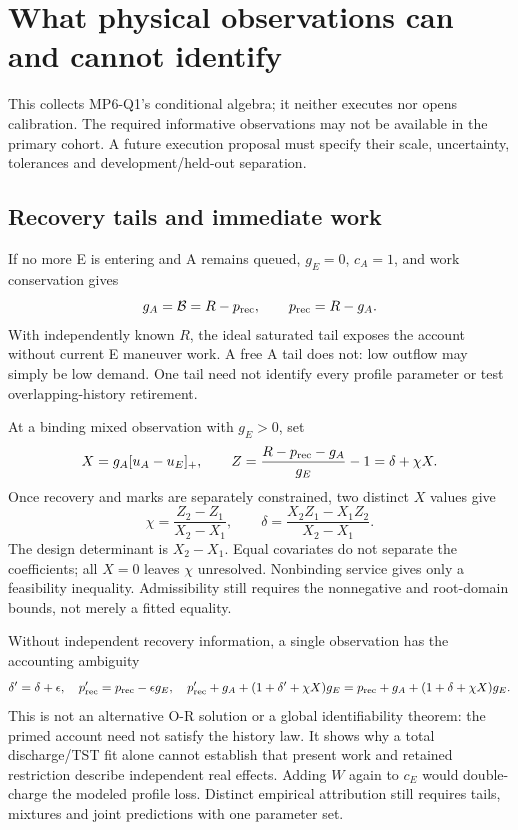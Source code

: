 \section{What physical observations can and cannot identify}
\label{sec:physical}
This collects MP6-Q1's conditional algebra; it neither executes nor opens
calibration. The required informative observations may not be available in
the primary cohort. A future execution proposal must specify their scale,
uncertainty, tolerances and development/held-out separation.

\subsection{Recovery tails and immediate work}
If no more E is entering and A remains queued, $g_E=0$, $c_A=1$, and
work conservation gives
\begin{equation}
 g_A=\mathcal B=R-p_{\mathrm{rec}},\qquad p_{\mathrm{rec}}=R-g_A. \label{eq:tailidentify}
\end{equation}
With independently known $R$, the ideal saturated tail exposes the account
without current E maneuver work. A free A tail does not: low outflow may
simply be low demand. One tail need not identify every profile parameter
or test overlapping-history retirement.

At a binding mixed observation with $g_E>0$, set
\begin{equation}
 X=g_A[u_A-u_E]_+,\qquad
 Z=\frac{R-p_{\mathrm{rec}}-g_A}{g_E}-1=\delta+\chi X. \label{eq:workidentify}
\end{equation}
Once recovery and marks are separately constrained, two distinct $X$
values give
\begin{equation}
 \chi=\frac{Z_2-Z_1}{X_2-X_1},\qquad
 \delta=\frac{X_2Z_1-X_1Z_2}{X_2-X_1}. \label{eq:rankidentify}
\end{equation}
The design determinant is $X_2-X_1$. Equal covariates do not separate
the coefficients; all $X=0$ leaves $\chi$ unresolved. Nonbinding service
gives only a feasibility inequality. Admissibility still requires the
nonnegative and root-domain bounds, not merely a fitted equality.

Without independent recovery information, a single observation has the
accounting ambiguity
\begin{equation}
 \delta'=\delta+\epsilon,\quad
 p_{\mathrm{rec}}'=p_{\mathrm{rec}}-\epsilon g_E,\quad
 p_{\mathrm{rec}}'+g_A+(1+\delta'+\chi X)g_E
 =p_{\mathrm{rec}}+g_A+(1+\delta+\chi X)g_E. \label{eq:confounding}
\end{equation}
This is not an alternative O-R solution or a global identifiability theorem:
the primed account need not satisfy the history law. It shows why a total
discharge/TST fit alone cannot establish that present work and retained
restriction describe independent real effects. Adding $W$ again to $c_E$
would double-charge the modeled profile loss. Distinct empirical attribution
still requires tails, mixtures and joint predictions with one parameter set.

